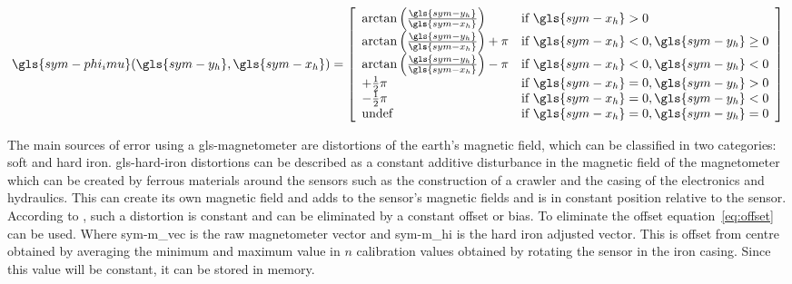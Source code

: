 \begin{equation}
    \label{eq:theta_imu}
    \gls{sym-phi_imu}(\gls{sym-y_h},\gls{sym-x_h}) = \left[\begin{array}{ll}
                                                               \arctan\left
                                                               (\frac{\gls{sym-y_h}}{\gls{sym-x_h}}\right) &
                                                               \text{if } \gls{sym-x_h} > 0 \\
                                                               \arctan\left
                                                               (\frac{\gls{sym-y_h}}{\gls{sym-x_h}}\right) + \pi &
                                                               \text{if } \gls{sym-x_h} < 0, \gls{sym-y_h} \geq 0 \\
                                                               \arctan\left
                                                               (\frac{\gls{sym-y_h}}{\gls{sym-x_h}}\right) - \pi &
                                                               \text{if } \gls{sym-x_h} < 0, \gls{sym-y_h} < 0 \\
                                                               +\frac{1}{2} \pi
                                                               & \text{if } \gls{sym-x_h} = 0, \gls{sym-y_h} > 0 \\
                                                               -\frac{1}{2} \pi
                                                               & \text{if } \gls{sym-x_h} = 0, \gls{sym-y_h} < 0 \\
                                                               \text{undef}
                                                               & \text{if } \gls{sym-x_h} = 0, \gls{sym-y_h} = 0
    \end{array}\right]
\end{equation}

The main sources of error using a \gls{gls-magnetometer} are distortions of the earth's magnetic field, which can be 
classified in two categories: soft and hard iron. \Gls{gls-hard-iron} distortions can be described as a constant 
additive disturbance in the magnetic field of the magnetometer which can be created by ferrous materials around the 
sensors such as the construction of a crawler and the casing of the electronics and hydraulics. This can create its 
own magnetic field and adds to the sensor's magnetic fields and is in constant position relative to the sensor. 
According to \citet{leccadito_kalman_2013}, such a distortion is constant and can be eliminated by a constant offset 
or bias. To eliminate the offset equation~\ref{eq:offset} can be used. Where \gls{sym-m_vec} is the raw 
magnetometer vector and \gls{sym-m_hi} is the hard iron adjusted vector. This is offset from centre obtained by 
averaging the minimum and maximum value in \( n \) calibration values obtained by rotating the sensor in the iron 
casing. Since this value will be constant, it can be stored in memory.

